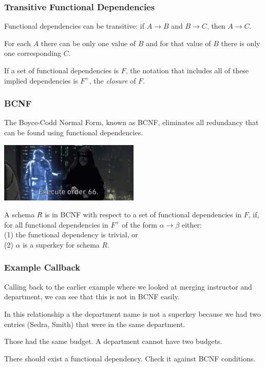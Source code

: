 \begin{frame}
\frametitle{Transitive Functional Dependencies}

Functional dependencies can be transitive: if $A \rightarrow B$ and $B \rightarrow C$, then $A \rightarrow C$. 

For each $A$ there can be only one value of $B$ and for that value of $B$ there is only one corresponding $C$. 

If a set of functional dependencies is $F$, the notation that includes all of these implied dependencies is $F^{+}$, the \textit{closure} of $F$.


\end{frame}



\begin{frame}
\frametitle{BCNF}

The \alert{Boyce-Codd Normal Form}, known as BCNF, eliminates all redundancy that can be found using functional dependencies.

\begin{center}
	\includegraphics[width=0.5\textwidth]{images/order66.jpg}
\end{center}

A schema $R$ is in BCNF with respect to a set of functional dependencies in $F$, if, for all functional dependencies in $F^{+}$ of the form $\alpha \rightarrow \beta$ either: \\
\quad (1) the functional dependency is trivial, or\\
\quad (2) $\alpha$ is a superkey for schema $R$.


\end{frame}


\begin{frame}
\frametitle{Example Callback}
Calling back to the earlier example where we looked at merging instructor and department, we can see that this is not in BCNF easily. 

In this relationship a the department name is not a superkey because we had two entries (Sedra, Smith) that were in the same department.

Those had the same budget. A department cannot have two budgets.

There should exist a functional dependency. Check it against BCNF conditions.

\end{frame}


